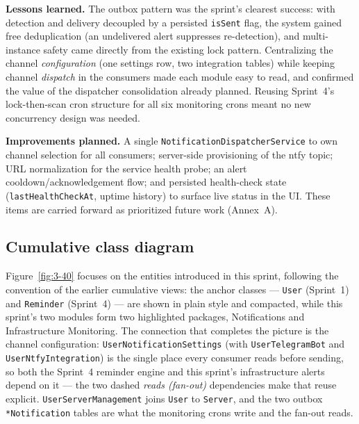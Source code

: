 \textbf{Lessons learned.} The outbox pattern was the sprint's clearest success: with detection
and delivery decoupled by a persisted \texttt{isSent} flag, the system gained free deduplication
(an undelivered alert suppresses re-detection), and multi-instance safety came directly from the
existing lock pattern. Centralizing the channel \emph{configuration} (one settings row, two
integration tables) while keeping channel \emph{dispatch} in the consumers made each module
easy to read, and confirmed the value of the dispatcher consolidation already
planned. Reusing Sprint~4's lock-then-scan cron structure for all six monitoring crons meant no
new concurrency design was needed.

\textbf{Improvements planned.} A single \texttt{NotificationDispatcherService} to own channel
selection for all consumers; server-side provisioning of the ntfy topic; URL normalization for
the service health probe; an alert cooldown/acknowledgement flow; and persisted health-check
state (\texttt{lastHealthCheckAt}, uptime history) to surface live status in the UI. These
items are carried forward as prioritized future work (Annex~A).

\subsection{Cumulative class diagram}

Figure~\ref{fig:3-40} focuses on the entities introduced in this sprint, following the
convention of the earlier cumulative views: the anchor classes --- \texttt{User} (Sprint~1)
and \texttt{Reminder} (Sprint~4) --- are shown in plain style and compacted, while this
sprint's two modules form two highlighted packages, Notifications and Infrastructure
Monitoring. The connection that completes the picture is the channel configuration:
\texttt{UserNotificationSettings} (with \texttt{UserTelegramBot} and
\texttt{UserNtfyIntegration}) is the single place every consumer reads before sending, so both
the Sprint~4 reminder engine and this sprint's infrastructure alerts depend on it ---
the two dashed \emph{reads (fan-out)} dependencies make that reuse explicit.
\texttt{UserServerManagement} joins \texttt{User} to \texttt{Server}, and the two outbox
\texttt{*Notification} tables are what the monitoring crons write and the fan-out reads.


